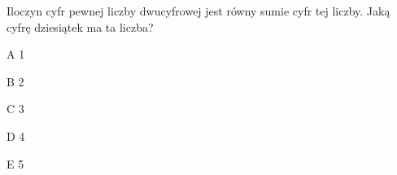\begin{tresc}
Iloczyn cyfr pewnej liczby dwucyfrowej jest równy sumie cyfr tej liczby. Jaką cyfrę dziesiątek ma ta liczba?
\end{tresc}
\begin{wariant}{A} 1 \end{wariant}
\begin{wariant}{B} 2 \end{wariant}
\begin{wariant}{C} 3 \end{wariant}
\begin{wariant}{D} 4 \end{wariant}
\begin{wariant}{E} 5 \end{wariant}
